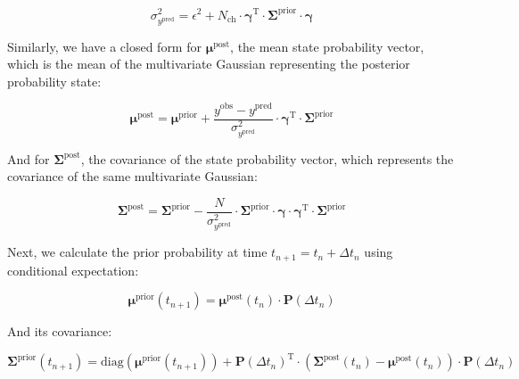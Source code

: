 \documentclass[pdflatex,sn-mathphys-num]{sn-jnl}%
\theoremstyle{thmstyleone}%
\theoremstyle{thmstyletwo}%
\theoremstyle{thmstylethree}%
\begin{document}
\begin{equation}
	\sigma^2_{y^{\text{pred}}} = \epsilon^2 + N_{\text{ch}} \cdot \boldsymbol{\gamma}^{\mathrm{T}} \cdot \boldsymbol{\Sigma}^{\text{prior}} \cdot \boldsymbol{\gamma}
	\label{eq:macro_sigma_pred}
\end{equation}

Similarly, we have a closed form for \( \boldsymbol{\mu}^{\text{post}} \), the mean state probability vector, which is the mean of the multivariate Gaussian representing the posterior probability state:

\begin{equation}
	\boldsymbol{\mu}^{\text{post}} = \boldsymbol{\mu}^{\text{prior}} + \frac{y^{\text{obs}} - y^{\text{pred}}}{\sigma^2_{y^{\text{pred}}}} \cdot \boldsymbol{\gamma}^{\mathrm{T}} \cdot \boldsymbol{\Sigma}^{\text{prior}}
	\label{eq:macro_mean_posterior}
\end{equation}

And for \( \boldsymbol{\Sigma}^{\text{post}} \), the covariance of the state probability vector, which represents the covariance of the same multivariate Gaussian:

\begin{equation}
	\boldsymbol{\Sigma}^{\text{post}} = \boldsymbol{\Sigma}^{\text{prior}} - \frac{N}{\sigma^2_{y^{\text{pred}}}} \cdot \boldsymbol{\Sigma}^{\text{prior}} \cdot \boldsymbol{\gamma} \cdot \boldsymbol{\gamma}^{\mathrm{T}} \cdot \boldsymbol{\Sigma}^{\text{prior}}
	\label{eq:macro_cov_posterior}
\end{equation}

Next, we calculate the prior probability at time \( t_{n+1} = t_n + \Delta t_n \) using conditional expectation:

\begin{equation}
	\boldsymbol{\mu}^{\text{prior}}(t_{n+1}) = \boldsymbol{\mu}^{\text{post}}(t_n) \cdot \mathbf{P}(\Delta t_n)
	\label{eq:macro_mean_next_prior}
\end{equation}

And its covariance:

\begin{equation}
	\boldsymbol{\Sigma}^{\text{prior}}(t_{n+1}) = \mathrm{diag}(\boldsymbol{\mu}^{\text{prior}}(t_{n+1})) + \mathbf{P}(\Delta t_n)^{\mathrm{T}} \cdot \left( \boldsymbol{\Sigma}^{\text{post}}(t_n) - \boldsymbol{\mu}^{\text{post}}(t_n) \right) \cdot \mathbf{P}(\Delta t_n)
	\label{eq:macro_mean_next_cov}
\end{equation}
\end{document}

